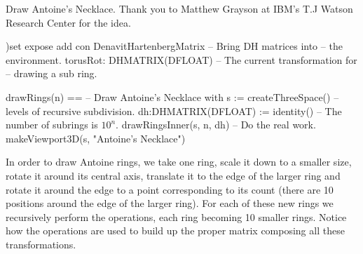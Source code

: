%
%
Draw Antoine's Necklace.
Thank you to Matthew Grayson at IBM's T.J Watson Research Center for the idea.

\begin{xmpLinesPlain}
)set expose add con DenavitHartenbergMatrix              -- Bring DH matrices into
                                                         -- \quad{}the environment.
torusRot: DHMATRIX(DFLOAT)                               -- The current transformation for
                                                         -- \quad{}drawing a sub ring.

drawRings(n) ==                                          -- Draw Antoine's Necklace with 
  s := createThreeSpace()                                -- \quad{}levels of recursive subdivision.
  dh:DHMATRIX(DFLOAT) := identity()                      -- \quad{}The number of subrings is $10^n$.
  drawRingsInner(s, n, dh)                               -- Do the real work.
  makeViewport3D(s, "Antoine's Necklace")

\end{xmpLinesPlain}

In order to draw Antoine rings, we take one ring, scale it down to
a smaller size, rotate it around its central axis, translate it
to the edge of the larger ring and rotate it around the edge to
a point corresponding to its count (there are 10 positions around
the edge of the larger ring). For each of these new rings we
recursively perform the operations, each ring becoming 10 smaller
rings. Notice how the  operations are used to build up
the proper matrix composing all these transformations.

